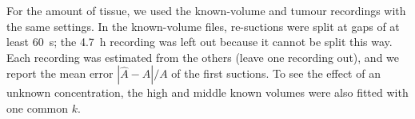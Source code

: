 For the amount of tissue, we used the known-volume and tumour recordings with the same settings. In the known-volume files,
re-suctions were split at gaps of at least \SI{60}{\second}; the \SI{4.7}{\hour} recording was
left out because it cannot be split this way. Each recording was estimated from the others
(leave one recording out), and we report the mean error $|\hat{A} - A| / A$ of the first
suctions. To see the effect of an unknown concentration, the high and middle known volumes were
also fitted with one common $k$.
